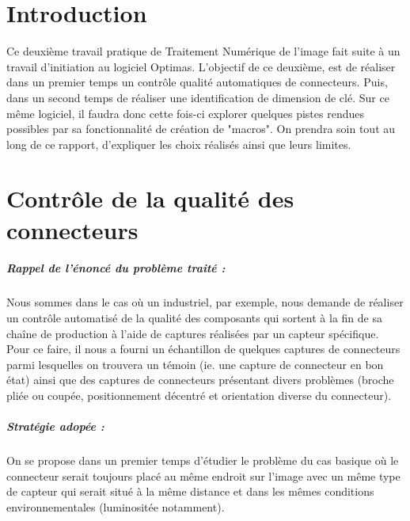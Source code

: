 \documentclass{scrreprt}
\begin{document}
\tableofcontents

\chapter{Introduction}

Ce deuxième travail pratique de Traitement Numérique de l'image fait suite à un travail d'initiation au logiciel
Optimas. L'objectif de ce deuxième, est de réaliser dans un premier temps un contrôle qualité automatiques de connecteurs. Puis, 
dans un second temps de réaliser une identification de dimension de clé. Sur ce même logiciel, il faudra donc cette fois-ci explorer
quelques pistes rendues possibles par sa fonctionnalité de création de "macros". On prendra soin tout au long de ce rapport, d'expliquer
les choix réalisés ainsi que leurs limites.


\chapter{Contrôle de la qualité des connecteurs}

\paragraph{Rappel de l'énoncé du problème traité :}
Nous sommes dans le cas où un industriel, par exemple, nous demande de réaliser un contrôle automatisé de la qualité des 
composants qui sortent à la fin de sa chaîne de production à l'aide de captures réalisées par un capteur spécifique.
Pour ce faire, il nous a fourni un échantillon de quelques captures de connecteurs parmi lesquelles on trouvera 
un témoin (ie. une capture de connecteur en bon état) ainsi que des captures de connecteurs présentant divers 
problèmes (broche pliée ou coupée, positionnement décentré et orientation diverse du connecteur).  

\paragraph{Stratégie adopée :}
On se propose dans un premier temps d'étudier le problème du cas basique où le connecteur serait toujours placé
au même endroit sur l'image avec un même type de capteur qui serait situé à la même distance et dans les mêmes conditions 
environnementales (luminositée notamment). 
\end{document}
